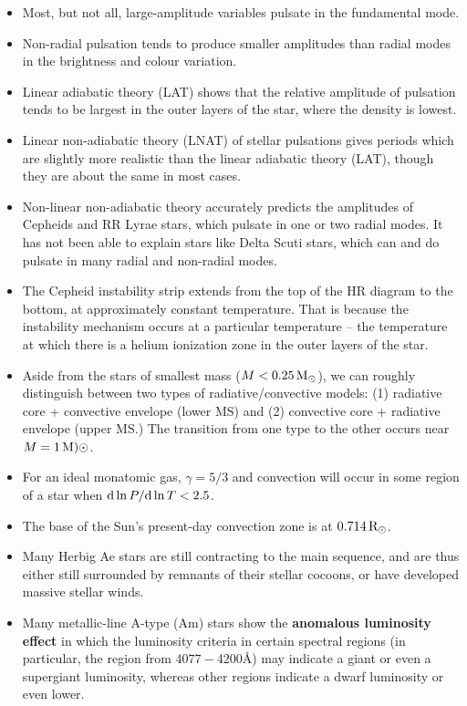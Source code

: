\documentclass[a4paper,10pt]{article}
\begin{document}
\begin{itemize}
    \item Most, but not all, large-amplitude variables pulsate in the fundamental mode.
    \item Non-radial pulsation tends to produce smaller amplitudes than radial modes in the brightness and colour variation.
    \item Linear adiabatic theory (LAT) shows that the relative amplitude of pulsation tends to be largest in the outer layers of the star, where the density is lowest.
    \item Linear non-adiabatic theory (LNAT) of stellar pulsations gives periods which are slightly more realistic than the linear adiabatic theory (LAT), though they are about the same in most cases.
    \item Non-linear non-adiabatic theory accurately predicts the amplitudes of Cepheids and RR Lyrae stars, which pulsate in one or two radial modes. It has not been able to explain stars like Delta Scuti stars, which can and do pulsate in many radial and non-radial modes.
    \item The Cepheid instability strip extends from the top of the HR diagram to the bottom, at approximately constant temperature. That is because the instability mechanism occurs at a particular temperature -- the temperature at which there is a helium ionization zone in the outer layers of the star.
    \item Aside from the stars of smallest mass ($M<0.25\,{\rm M_\odot}$), we can roughly distinguish between two types of radiative/convective models: (1) radiative core + convective envelope (lower MS) and (2) convective core + radiative envelope (upper MS.) The transition from one type to the other occurs near $M=1\,{\rm M)\odot}$.
    \item For an ideal monatomic gas, $\gamma=5/3$ and convection will occur in some region of a star when ${\rm d}\ln P/{\rm d}\ln T<2.5$.
    \item The base of the Sun's present-day convection zone is at $0.714\,{\rm R_\odot}$.
    \item Many Herbig Ae stars are still contracting to the main sequence, and are thus either still surrounded by remnants of their stellar cocoons, or have developed massive stellar winds.
    \item Many metallic-line A-type (Am) stars show the \textbf{anomalous luminosity effect} in which the luminosity criteria in certain spectral regions (in particular, the region from $4077-4200$\AA) may indicate a giant or even a supergiant luminosity, whereas other regions indicate a dwarf luminosity or even lower.

\end{itemize}
\end{document}
